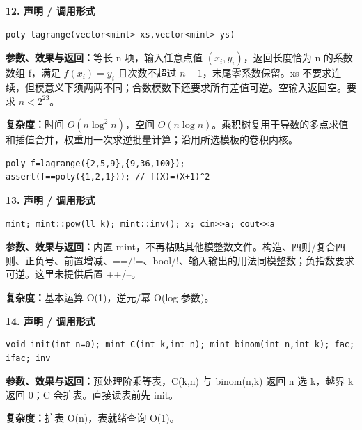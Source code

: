 \documentclass[UTF8,a4paper,10pt]{ctexart}
\begin{document}
\noindent\begin{minipage}{\textwidth}
\textbf{12. 声明 / 调用形式}
\begin{lstlisting}
poly lagrange(vector<mint> xs,vector<mint> ys)
\end{lstlisting}
\textbf{参数、效果与返回：}等长 n 项，输入任意点值 $(x_i,y_i)$，返回长度恰为 n 的系数数组 f，满足 $f(x_i)=y_i$ 且次数不超过 $n-1$，末尾零系数保留。xs 不要求连续，但模意义下须两两不同；合数模数下还要求所有差值可逆。空输入返回空。要求 $n<2^{23}$。

\textbf{复杂度：}时间 $O(n\log^2 n)$，空间 $O(n\log n)$。乘积树复用于导数的多点求值和插值合并，权重用一次求逆批量计算；沿用所选模板的卷积内核。

\begin{lstlisting}
poly f=lagrange({2,5,9},{9,36,100});
assert(f==poly({1,2,1})); // f(X)=(X+1)^2
\end{lstlisting}

\end{minipage}\par\vspace{0.4em}
\noindent\begin{minipage}{\textwidth}
\textbf{13. 声明 / 调用形式}
\begin{lstlisting}
mint; mint::pow(ll k); mint::inv(); x; cin>>a; cout<<a
\end{lstlisting}
\textbf{参数、效果与返回：}内置 mint，不再粘贴其他模整数文件。构造、四则/复合四则、正负号、前置增减、==/!=、bool/!、输入输出的用法同模整数；负指数要求可逆。这里未提供后置 ++/--。

\textbf{复杂度：}基本运算 O(1)，逆元/幂 O(log 参数)。

\end{minipage}\par\vspace{0.4em}
\noindent\begin{minipage}{\textwidth}
\textbf{14. 声明 / 调用形式}
\begin{lstlisting}
void init(int n=0); mint C(int k,int n); mint binom(int n,int k); fac; ifac; inv
\end{lstlisting}
\textbf{参数、效果与返回：}预处理阶乘等表，C(k,n) 与 binom(n,k) 返回 n 选 k，越界 k 返回 0；C 会扩表。直接读表前先 init。

\textbf{复杂度：}扩表 O(n)，表就绪查询 O(1)。

\end{minipage}\par\vspace{0.4em}
\end{document}
